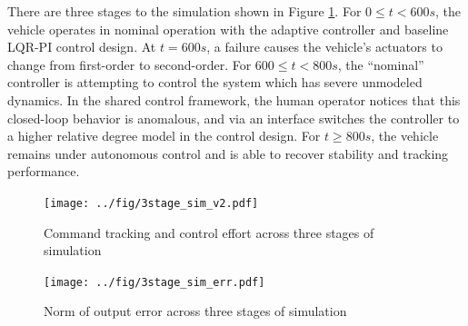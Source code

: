 \documentclass[english]{ifacconf}
\begin{document}
There are three stages to the simulation shown in Figure \ref{fig:sim}. For $0 \leq t < 600 s$, the vehicle operates in nominal operation with the adaptive controller and baseline LQR-PI control design. At $t = 600 s$, a failure causes the vehicle's actuators to change from first-order to second-order. For $600 \leq t < 800 s$, the ``nominal'' controller is attempting to control the system which has severe unmodeled dynamics. In the shared control framework, the human operator notices that this closed-loop behavior is anomalous, and via an interface switches the controller to a higher relative degree model in the control design. For $t \geq 800 s$, the vehicle remains under autonomous control and is able to recover stability and tracking performance.

\begin{figure}[htbp]
	\centering
	\texttt{[image: ../fig/3stage\_sim\_v2.pdf]}
	\caption{Command tracking and control effort across three stages of simulation}
	\label{fig:sim}
\end{figure}

\begin{figure}[htbp]
	\centering
	\texttt{[image: ../fig/3stage\_sim\_err.pdf]}
	\caption{Norm of output error across three stages of simulation}
	\label{fig:err}
\end{figure}


\end{document}
